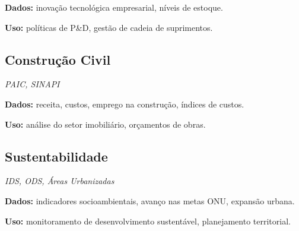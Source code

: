 \documentclass[12pt,a4paper]{article}
\begin{document}
\textbf{Dados:} inovação tecnológica empresarial, níveis de estoque.

\textbf{Uso:} políticas de P\&D, gestão de cadeia de suprimentos.

\subsection{Construção Civil}
\textit{PAIC, SINAPI}

\textbf{Dados:} receita, custos, emprego na construção, índices de custos.

\textbf{Uso:} análise do setor imobiliário, orçamentos de obras.

\subsection{Sustentabilidade}
\textit{IDS, ODS, Áreas Urbanizadas}

\textbf{Dados:} indicadores socioambientais, avanço nas metas ONU, expansão urbana.

\textbf{Uso:} monitoramento de desenvolvimento sustentável, planejamento territorial.
\end{document}
